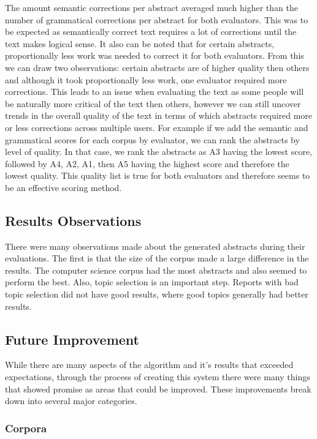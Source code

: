 \documentclass[letterpaper, 10 pt, conference]{ieeeconf}  %
\begin{document}
The amount semantic corrections per abstract averaged much higher than the number of grammatical corrections per abstract for both evaluators. This was to be expected as semantically correct text requires a lot of corrections until the text makes logical sense. It also can be noted that for certain abstracts, proportionally less work was needed to correct it for both evaluators. From this we can draw two observations: certain abstracts are of higher quality then others and although it took proportionally less work, one evaluator required more corrections. This leads to an issue when evaluating the text as some people will be naturally more critical of the text then others, however we can still uncover trends in the overall quality of the text in terms of which abstracts required more or less corrections across multiple users. For example if we add the semantic and grammatical scores for each corpus by evaluator, we can rank the abstracts by level of quality. In that case, we rank the abstracts as A3 having the lowest score, followed by A4, A2, A1, then A5 having the highest score and therefore the lowest quality. This quality list is true for both evaluators and therefore seems to be an effective scoring method.



\subsection{Results Observations}

There were many observations made about the generated abstracts during their evaluations. The first is that the size of the corpus made a large difference in the results. The computer science corpus had the most abstracts and also seemed to perform the best. Also, topic selection is an important step. Reports with bad topic selection did not have good results, where good topics generally had better results.

\subsection{Future Improvement}

While there are many aspects of the algorithm and it's results that exceeded expectations, through the process of creating this system there were many things that showed promise as areas that could be improved. These improvements break down into several major categories.

\subsubsection{Corpora}
\end{document}
